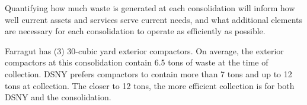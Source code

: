 
    Quantifying how much waste is generated at each consolidation will inform how well current assets and services serve current needs, and what additional elements are necessary for each consolidation to operate as efficiently as possible.
    
    Farragut has (3) 30-cubic yard exterior compactors. On average, the exterior compactors at this consolidation contain 6.5 tons of waste at the time of collection. DSNY prefers compactors to contain more than 7 tons and up to 12 tons at collection. The closer to 12 tons, the more efficient collection is for both DSNY and the consolidation.